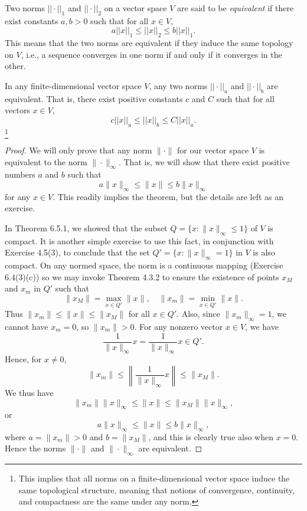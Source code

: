 \begin{definition}
    Two norms \( || \cdot ||_1 \) and \( || \cdot ||_2 \) on a vector space \( V \) are said to be \textit{equivalent} if there exist constants \( a, b > 0 \) such that for all \( x \in V \),
    \[
    a ||x||_1 \leq ||x||_2 \leq b ||x||_1.
    \]
    This means that the two norms are equivalent if they induce the same topology on \( V \), i.e., a sequence converges in one norm if and only if it converges in the other.
\end{definition}

\begin{theorem}
    In any finite-dimensional vector space \( V \), any two norms \( ||\cdot||_a \) and \( ||\cdot||_b \) are equivalent. That is, there exist positive constants \( c \) and \( C \) such that for all vectors \( x \in V \),
    \[
    c ||x||_a \leq ||x||_b \leq C ||x||_a.
    \]\footnote{
    This implies that all norms on a finite-dimensional vector space induce the same topological structure, meaning that notions of convergence, continuity, and compactness are the same under any norm.}
\end{theorem}
\begin{proof}
We will only prove that any norm \( \|\cdot\| \) for our vector space \( V \) is equivalent to the norm \( \|\cdot\|_{\infty} \). That is, we will show that there exist positive numbers \( a \) and \( b \) such that
\[
a\|x\|_{\infty} \leq \|x\| \leq b\|x\|_{\infty}
\]
for any \( x \in V \). This readily implies the theorem, but the details are left as an exercise.

In Theorem 6.5.1, we showed that the subset \( Q = \{x : \|x\|_{\infty} \leq 1\} \) of \( V \) is compact. It is another simple exercise to use this fact, in conjunction with Exercise 4.5(3), to conclude that the set \( Q' = \{x : \|x\|_{\infty} = 1\} \) in \( V \) is also compact. On any normed space, the norm is a continuous mapping (Exercise 6.4(3)(c)) so we may invoke Theorem 4.3.2 to ensure the existence of points \( x_M \) and \( x_m \) in \( Q' \) such that
\[
\|x_M\| = \max_{x \in Q'} \|x\|, \quad \|x_m\| = \min_{x \in Q'} \|x\|.
\]
Thus \( \|x_m\| \leq \|x\| \leq \|x_M\| \) for all \( x \in Q' \). Also, since \( \|x_m\|_{\infty} = 1 \), we cannot have \( x_m = 0 \), so \( \|x_m\| > 0 \). For any nonzero vector \( x \in V \), we have
\[
\frac{1}{\|x\|_{\infty}} x = \frac{1}{\|x\|_{\infty}} x \in Q'.
\]
Hence, for \( x \neq 0 \),
\[
\|x_m\| \leq \left\|\frac{1}{\|x\|_{\infty}} x\right\| \leq \|x_M\|.
\]
We thus have
\[
\|x_m\| \|x\|_{\infty} \leq \|x\| \leq \|x_M\| \|x\|_{\infty},
\]
or
\[
a\|x\|_{\infty} \leq \|x\| \leq b\|x\|_{\infty},
\]
where \( a = \|x_m\| > 0 \) and \( b = \|x_M\| \), and this is clearly true also when \( x = 0 \). Hence the norms \( \|\cdot\| \) and \( \|\cdot\|_{\infty} \) are equivalent.
\end{proof}


